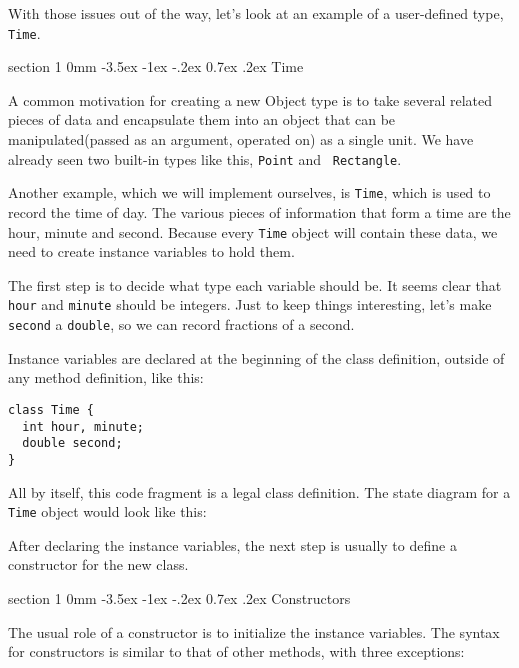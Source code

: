 \documentclass{book}
\makeatletter
\renewcommand{\section}{\@startsection 
    {section} {1} {0mm}%
    {-3.5ex \@plus -1ex \@minus -.2ex}%
    {0.7ex \@plus.2ex}%
    {\normalfont\Large\bfseries}}
\newcommand{\beforefig}{\vspace{1.3\parskip}}
\newcommand{\afterfig}{\vspace{-0.2\parskip}}
\newcommand{\myfig}[1]{
    \beforefig
    \centerline{\epsfig{#1,scale=0.8}}
    \afterfig
}
\makeatother
\begin{document}
With those issues out of the way, let's look at an example of
a user-defined type, {\tt Time}.

\section{Time}

A common motivation for creating a new Object type is to take several
related pieces of data and encapsulate them into an object that can be
manipulated(passed as an argument, operated on) as a single unit.  We
have already seen two built-in types like this, {\tt Point} and {\tt
Rectangle}.

Another example, which we will implement ourselves, is {\tt Time},
which is used to record the time of day.  The various pieces of
information that form a time are the hour, minute and second.  Because
every {\tt Time} object will contain these data, we need to create
instance variables to hold them.

The first step is to decide what type each variable should be.  It
seems clear that {\tt hour} and {\tt minute} should be integers.  Just
to keep things interesting, let's make {\tt second} a {\tt double}, so
we can record fractions of a second.


Instance variables are declared at the beginning of the class
definition, outside of any method definition, like this:

\begin{verbatim}
class Time {
  int hour, minute;
  double second;
}
\end{verbatim}
%
All by itself, this code fragment is a legal class definition.  The
state diagram for a {\tt Time} object would look like this:


\myfig{figure=figs/time.eps}


After declaring the instance variables, the next step is usually
to define a constructor for the new class.

\section{Constructors}

The usual role of a constructor is to initialize the instance
variables.  The syntax for constructors is similar to that
of other methods, with three exceptions:
\end{document}
